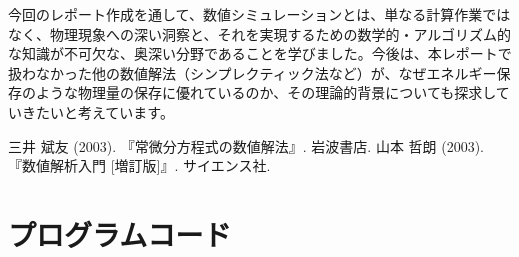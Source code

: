 \documentclass{article}
\begin{document}
今回のレポート作成を通して、数値シミュレーションとは、単なる計算作業ではなく、物理現象への深い洞察と、それを実現するための数学的・アルゴリズム的な知識が不可欠な、奥深い分野であることを学びました。今後は、本レポートで扱わなかった他の数値解法（シンプレクティック法など）が、なぜエネルギー保存のような物理量の保存に優れているのか、その理論的背景についても探求していきたいと考えています。

\begin{thebibliography}{9}
     三井 斌友 (2003). 『常微分方程式の数値解法』. 岩波書店.
     山本 哲朗 (2003). 『数値解析入門 [増訂版]』. サイエンス社.
\end{thebibliography}

\appendix
\section{プログラムコード}
\end{document}
